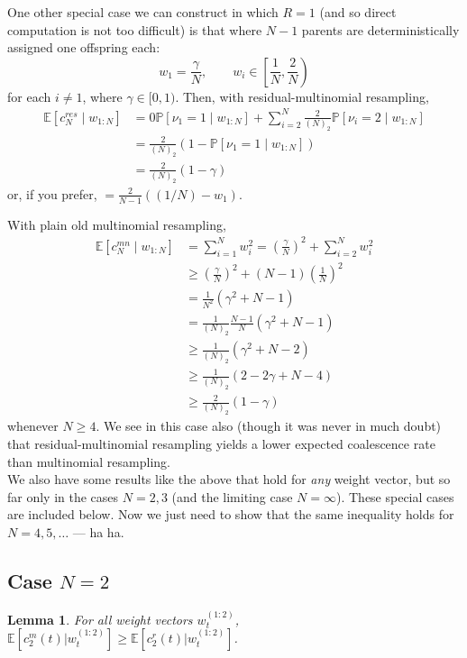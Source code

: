 \documentclass{article}
\newtheorem{lemma}{Lemma}
\newcommand{\Prob}{\mathbb{P}}
\newcommand{\E}{\mathbb{E}}
\newcommand{\1}[1]{\mathbbm{1}_{#1}}
\begin{document}
One other special case we can construct in which $R=1$ (and so direct computation is not too difficult) is that where $N-1$ parents are deterministically assigned one offspring each:
\begin{equation*}
w_1 = \frac{\gamma}{N} , \qquad w_i \in \left[ \frac{1}{N}, \frac{2}{N} \right)
\end{equation*}
for each $i\neq 1$, where $\gamma \in [0,1)$.
Then, with residual-multinomial resampling,
\begin{align*}
\E[c_N^{res} \mid w_{1:N}] 
&= 0 \Prob[\nu_1 =1 \mid w_{1:N}] 
        + \sum_{i=2}^N \frac{2}{(N)_2} \Prob[\nu_i =2\mid w_{1:N}] \\
&= \frac{2}{(N)_2} \left( 1 - \Prob[\nu_1 =1 \mid w_{1:N}] \right) \\
&= \frac{2}{(N)_2} (1-\gamma)
\end{align*}
or, if you prefer, $=\frac{2}{N-1}((1/N) - w_1)$.

With plain old multinomial resampling,
\begin{align*}
\E[c_N^{mn} \mid w_{1:N}] 
&= \sum_{i=1}^N w_i^2
= \left( \frac{\gamma}{N} \right)^2 + \sum_{i=2}^N w_i^2 \\
&\geq \left( \frac{\gamma}{N} \right)^2 + (N-1) \left( \frac{1}{N} \right)^2 \\
&= \frac{1}{N^2} (\gamma^2 + N-1) \\
&= \frac{1}{(N)_2} \frac{N-1}{N}  (\gamma^2 + N-1) \\
&\geq \frac{1}{(N)_2} (\gamma^2 + N-2) \\
&\geq \frac{1}{(N)_2} (2 -2\gamma +N -4 ) \\
&\geq \frac{2}{(N)_2} (1-\gamma)
\end{align*}
whenever $N\geq 4$.
We see in this case also (though it was never in much doubt) that residual-multinomial resampling yields a lower expected coalescence rate than multinomial resampling. \\

We also have some results like the above that hold for \emph{any} weight vector, but so far only in the cases $N=2,3$ (and the limiting case $N=\infty$). These special cases are included below. Now we just need to show that the same inequality holds for $N=4,5,\dots$ --- ha ha.

\subsection{Case $N=2$}
\begin{lemma}
For all weight vectors $w_t^{(1:2)}$, 
$\E[c_2^m(t) |w_t^{(1:2)}] \geq \E[c_2^r(t) |w_t^{(1:2)}]$.
\end{lemma}
\end{document}
